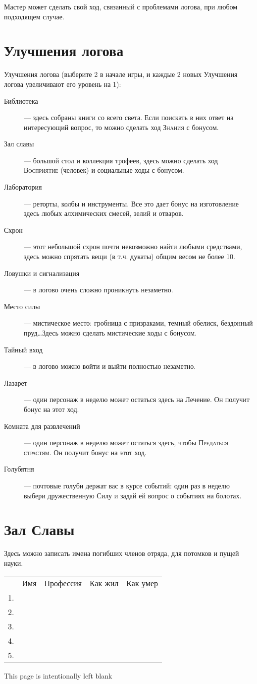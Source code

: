 \documentclass[10pt,twoside]{report}
\begin{document}
Мастер может сделать свой
ход, связанный с проблемами логова, при любом подходящем случае.
\vfill
\pagebreak


\section*{Улучшения логова}

Улучшения логова (выберите 2 в начале игры, и каждые 2 новых Улучшения
логова увеличивают его уровень на 1):
\begin{description}
  \item[Библиотека]--- здесь собраны книги со всего света. Если
    поискать в них ответ на интересующий вопрос, то можно сделать ход
    \textsc{Знания} с бонусом.
  \item[Зал славы]--- большой стол и коллекция трофеев, здесь можно
    сделать ход \textsc{Восприятие} (человек) и социальные ходы с бонусом.
  \item[Лаборатория]--- реторты, колбы и инструменты. Все это дает
    бонус на изготовление здесь любых алхимических смесей, зелий и
    отваров.
  \item[Схрон]--- этот небольшой схрон почти невозможно найти любыми
    средствами, здесь можно спрятать вещи (в т.ч. дукаты) общим весом
    не более 10.
  \item[Ловушки и сигнализация]--- в логово очень сложно проникнуть
    незаметно.
  \item[Место силы]--- мистическое место: гробница с призраками,
    темный обелиск, бездонный пруд\ldots Здесь можно сделать
    мистические ходы с бонусом.
  \item[Тайный вход]--- в логово можно войти и выйти полностью
    незаметно.
  \item[Лазарет]--- один персонаж в неделю может остаться здесь на
    Лечение. Он получит бонус на этот ход.
  \item[Комната для развлечений]--- один персонаж в неделю может
    остаться здесь, чтобы \textsc{Предаться страстям}. Он получит бонус на этот
    ход.
  \item[Голубятня]--- почтовые голуби держат вас в курсе событий: один
    раз в неделю выбери дружественную Силу и задай ей вопрос о
    событиях на болотах.
\end{description}
\vfill
\pagebreak

\section*{Зал Славы}
Здесь можно записать имена погибших членов отряда, для потомков и
пущей науки.

\begin{tabular}{p{0.5cm} l l l l}
  &Имя&Профессия&Как жил&Как умер \\
  1.&&&& \\
  2.&&&& \\
  3.&&&& \\
  4.&&&& \\
  5.&&&& \\
  
\end{tabular}

\pagebreak
\thispagestyle{empty}
This page is intentionally left blank
\end{document}
